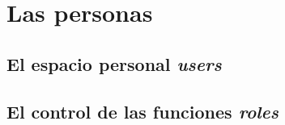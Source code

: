 \chapter{Las personas}

\section{El espacio personal \emph{users}}
\section{El control de las funciones \emph{roles}}
